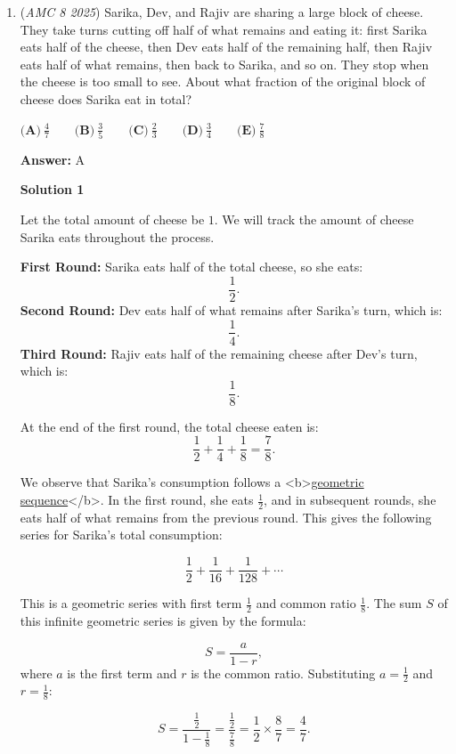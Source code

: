 \begin{enumerate}
 
 \[5\ \text{mi} + 3.5\ \text{mi} = \boxed{\textbf{(D) 8.5}}\] miles. $\square$



	\item (\textit{AMC 8 2025}) Sarika, Dev, and Rajiv are sharing a large block of cheese. They take turns cutting off half of what
remains and eating it: first Sarika eats half of the cheese, then Dev eats half of the remaining half,
then Rajiv eats half of what remains, then back to Sarika, and so on. They stop when the cheese is
too small to see. About what fraction of the original block of cheese does Sarika eat in total?


 $\textbf{(A)}\ \frac{4}{7}\qquad \textbf{(B)}\ \frac{3}{5}\qquad \textbf{(C)}\ \frac{2}{3}\qquad \textbf{(D)}\ \frac{3}{4}\qquad \textbf{(E)}\ \frac{7}{8}$

 \textbf{Answer: }A



\textbf{Solution 1}

Let the total amount of cheese be $1$. We will track the amount of cheese Sarika eats throughout the process.

 \textbf{First Round:} Sarika eats half of the total cheese, so she eats:
 \[\frac{1}{2}.\]\textbf{Second Round:} Dev eats half of what remains after Sarika's turn, which is:
 \[\frac{1}{4}.\]\textbf{Third Round:} Rajiv eats half of the remaining cheese after Dev’s turn, which is:
 \[\frac{1}{8}.\]

 At the end of the first round, the total cheese eaten is:
 \[\frac{1}{2} + \frac{1}{4} + \frac{1}{8} = \frac{7}{8}.\]

 We observe that Sarika’s consumption follows a <b>\href{https://artofproblemsolving.com/wiki/index.php?title=Geometric\_sequence}{geometric sequence}</b>. In the first round, she eats $\frac{1}{2}$, and in subsequent rounds, she eats half of what remains from the previous round. This gives the following series for Sarika’s total consumption:

 
 \[\frac{1}{2} + \frac{1}{16} + \frac{1}{128} + \cdots\]

 This is a geometric series with first term $\frac{1}{2}$ and common ratio $\frac{1}{8}$. The sum $S$ of this infinite geometric series is given by the formula:

 
 \[S = \frac{a}{1 - r},\]where $a$ is the first term and $r$ is the common ratio. Substituting $a = \frac{1}{2}$ and $r = \frac{1}{8}$:

 
 \[S = \frac{\frac{1}{2}}{1 - \frac{1}{8}} = \frac{\frac{1}{2}}{\frac{7}{8}} = \frac{1}{2} \times \frac{8}{7} = \frac{4}{7}.\]


\end{enumerate}
